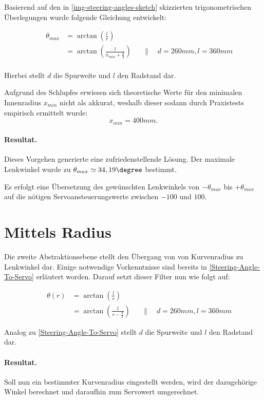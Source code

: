 \documentclass[a4paper,12pt]{report}
\begin{document}
	Basierend auf den in \autoref{img-steering-angles-sketch} skizzierten trigonometrischen Überlegungen wurde folgende Gleichung entwickelt:

	\begin{align*}
		&&\theta_{max} &= \arctan\left( \frac{l}{r} \right)\\
		&&&= \arctan\left( \frac{l}{x_{min} + \frac{d}{2}} \right) &&\|\quad d = 260mm, l = 360mm
	\end{align*}
	\\
	Hierbei stellt $d$ die Spurweite und $l$ den Radstand dar.

	Aufgrund des Schlupfes erwiesen sich theoretische Werte für den minimalen Innenradius $x_{min}$ nicht als akkurat, weshalb dieser sodann durch  Praxistests %
	empirisch ermittelt wurde:
		\[x_{min} = 400mm.\]

	\paragraph{Resultat.}
	Dieses Vorgehen generierte eine zufriedenstellende Lösung.
	Der maximale Lenkwinkel wurde zu $\theta_{max} \simeq 34,19\degree$ bestimmt.

	Es erfolgt eine Übersetzung des gewünschten Lenkwinkels von $-\theta_{max}$ bis $+\theta_{max}$ auf die nötigen Servoansteuerungswerte zwischen $-100$ und $100$.

\section{Mittels Radius}

	Die zweite Abstraktionsebene stellt den Übergang von von Kurvenradius zu Lenkwinkel dar.
	Einige notwendige Vorkenntnisse sind bereits in \autoref{Steering-Angle-To-Servo} erläutert worden.
	Darauf setzt dieser Filter nun wie folgt auf:

		\begin{align*}
		&&\theta\left(r\right) &= \arctan\left( \frac{l}{r} \right)\\
		&&&= \arctan\left( \frac{l}{r - \frac{d}{2}} \right) &&\|\quad d = 260mm, l = 360mm
		\end{align*}

	Analog zu \autoref{Steering-Angle-To-Servo} stellt $d$ die Spurweite und $l$ den Radstand dar.

	\paragraph{Resultat.}
	Soll nun ein bestimmter Kurvenradius eingestellt werden, wird der dazugehörige Winkel berechnet und daraufhin zum Servowert umgerechnet.
\end{document}

